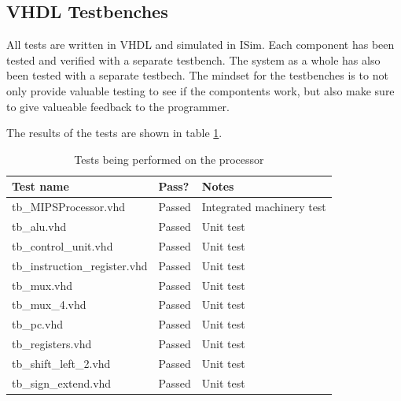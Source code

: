 \subsection{VHDL Testbenches}

All tests are written in VHDL and simulated in ISim.
Each component has been tested and verified with a separate testbench.
The system as a whole has also been tested with a separate testbech.
The mindset for the testbenches is to not only provide valuable testing to see if the compontents work,
but also make sure to give valueable feedback to the programmer.

The results of the tests are shown in table \ref{tab:tests}.

\begin{table}[ht+]
    \centering
    \begin{tabular}{|l|l|l|}
        \hline
        \textbf{Test name}            & \textbf{Pass?} & \textbf{Notes}            \\ \hline
        tb\_MIPSProcessor.vhd         & Passed         & Integrated machinery test \\ \hline
        tb\_alu.vhd                   & Passed         & Unit test                 \\ \hline
        tb\_control\_unit.vhd         & Passed         & Unit test                 \\ \hline
        tb\_instruction\_register.vhd & Passed         & Unit test                 \\ \hline
        tb\_mux.vhd                   & Passed         & Unit test                 \\ \hline
        tb\_mux\_4.vhd                & Passed         & Unit test                 \\ \hline
        tb\_pc.vhd                    & Passed         & Unit test                 \\ \hline
        tb\_registers.vhd             & Passed         & Unit test                 \\ \hline
        tb\_shift\_left\_2.vhd        & Passed         & Unit test                 \\ \hline
        tb\_sign\_extend.vhd          & Passed         & Unit test                 \\ \hline
    \end{tabular}
    \caption{Tests being performed on the processor}
    \label{tab:tests}
\end{table}


